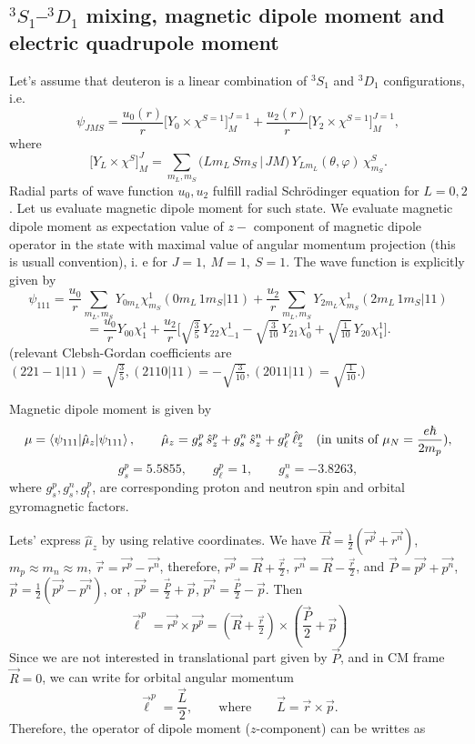 \documentclass[11pt,a4paper]{article}
\newcommand{\op}[1]{\hat{#1}}
\begin{document}
\subsection{\texorpdfstring{${}^3S_1$}{3S1}--\texorpdfstring{${}^3D_1$}{3D1} mixing, magnetic dipole moment and electric quadrupole moment}
Let's assume that deuteron is a linear combination of ${}^3S_1$ and ${}^3D_1$ configurations, i.e.
\[
\psi_{JMS}=\frac{u_0(r)}{r}\big[Y_0\times\chi^{S=1}\big]^{J=1}_M
+\frac{u_2(r)}{r}\big[Y_2\times\chi^{S=1}\big]^{J=1}_M,
\]
where
\[
\big[Y_L\times\chi^S\big]^J_M=\sum_{m_L,m_S}\big(Lm_L\,Sm_S\,|\,JM\big)\,Y_{Lm_L}(\theta,\varphi)\,\chi^S_{m_S}.
\]
Radial parts of wave function $u_0,u_2$ fulfill radial Schr\"odinger equation for $L=0,2$. Let us evaluate magnetic dipole moment for such state. We evaluate magnetic dipole moment as expectation value of $z-$ component of magnetic dipole operator in the state with maximal value of angular momentum projection (this is usuall convention), i. e for $J=1,\ M=1,\ S=1$. The wave function is explicitly given by 
\[
\psi_{111}=\frac{u_0}{r}\sum_{m_L,m_S}Y_{0m_L}\chi^1_{m_S}(0m_L\,1m_S|11)
+\frac{u_2}{r}\sum_{m_L,m_S}Y_{2m_L}\chi^1_{m_S}(2m_L\,1m_S|11)
\]
\[
=\frac{u_0}{r}Y_{00} \chi^1_1
+\frac{u_2}{r}\Big[\sqrt{\tfrac35}\,Y_{22}\chi^1_{-1}-\sqrt{\tfrac{3}{10}}\,Y_{21}\chi^1_0
+\sqrt{\tfrac{1}{10}}\,Y_{20}\chi^1_1\Big].
\]
(relevant Clebsh-Gordan coefficients are $(221-1|11)=\sqrt{\frac{3}{5}}, (2110|11)=-\sqrt{\frac{3}{10}}, (2011|11)=\sqrt{\frac{1}{10}}$.)

Magnetic dipole moment is given by
\[
\mu=\braket{\psi_{111}|\op\mu_z|\psi_{111}},
\qquad
\op\mu_z=g_s^p\,\op s_z^p+g_s^n\,\op s_z^n+g_\ell^p\,\op\ell_z^p
\quad(\text{in units of }\mu_N=\frac{e \hbar}{2m_p}),
\]
\[
g_s^p=5.5855,\qquad g_\ell^p=1,\qquad g_s^n=-3.8263,
\]
where $g_s^p,g_s^n,g_l^p$, are corresponding proton and neutron spin and orbital gyromagnetic factors. 

Lets' express $\op \mu_z$ by using relative coordinates. We have
$\vec R=\tfrac12( \vec {r^p}+\vec {r^n})$, $m_p\approx m_n\approx m$,
$\vec r=\vec {r^p}-\vec {r^n}$, therefore, $\vec {r^p}=\vec R+\tfrac{\vec r}{2}$, $\vec
{r^n}=\vec R-\tfrac{\vec r}{2}$, and $ \vec P=\vec {p^p}+\vec {p^n}$,
$\vec p=\tfrac12(\vec {p^p}-\vec {p^n})$, or ,  $\vec {p^p}=\tfrac{\vec P}{2}+\vec p$,
$\vec {p^n}=\tfrac{\vec P}{2}-\vec p$. Then
\[
\vec\ell^p=\vec {r^p}\times\vec {p^p}=(\vec R +\tfrac{\vec r}{2})\times(\frac{\vec P}{2}+ \vec p) 
\]
Since we are not interested in translational part given by $\vec P$, and in CM frame $\vec R = 0$, we can write for orbital angular momentum 
\[
\vec\ell^p=\frac{\vec L}{2},\qquad\text{where} \qquad \vec L = \vec r \times \vec p.   
\]
Therefore, the operator of dipole moment ($z$-component) can be writtes as 
\end{document}
